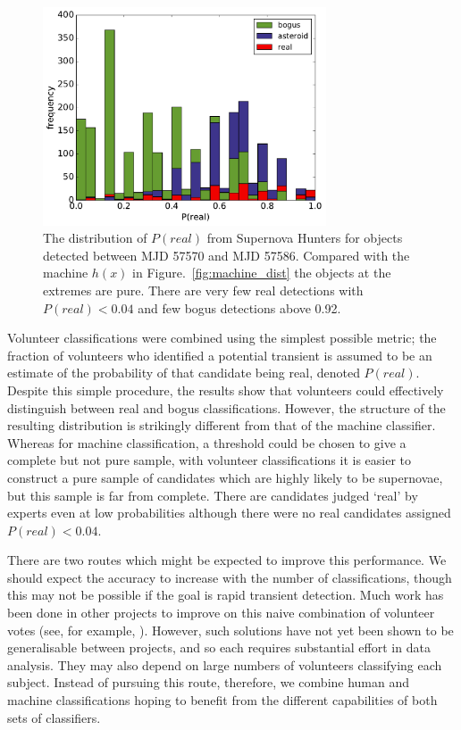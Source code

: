 \message{ !name(blank.tex)}\documentclass[a4paper,fleqn,usenatbib]{mnras}
\begin{document}
\begin{figure}
   \includegraphics[width=84mm]{figs/human_hist.pdf}
   \caption{The distribution of $P(real)$ from Supernova Hunters for objects detected between 
            MJD 57570 and MJD 57586.  Compared with the machine $h(x)$ in Figure.~\ref{fig:machine_dist}
            the objects at the extremes are pure.  There are very few real detections with 
            $P(real) < 0.04$ and few bogus detections above 0.92.} 
   \label{fig:human_dist} 
\end{figure}

Volunteer classifications were combined using the simplest possible metric; the fraction of volunteers who identified a potential transient is assumed to be an estimate of the probability of that candidate being real, denoted $P(real)$. Despite this simple procedure, the results show that volunteers could effectively distinguish between real and bogus classifications. However, the structure of the resulting distribution is strikingly different from that of the machine classifier. Whereas for machine classification, a threshold could be chosen to give a complete but not pure sample, with volunteer classifications it is easier to construct a pure sample of candidates which are highly likely to be supernovae, but this sample is far from complete. There are candidates judged `real' by experts even at low probabilities although there were no real candidates assigned $P(real) < 0.04$. 


There are two routes which might be expected to improve this performance. We should expect the accuracy to increase with the number of classifications, though this may not be possible if the goal is rapid transient detection. Much work has been done in other projects to improve on this naive combination of volunteer votes (see, for example, \citet{Schwamb12, Marshall16}). However, such solutions have not yet been shown to be generalisable between projects, and so each requires substantial effort in data analysis. They may also depend on large numbers of volunteers classifying each subject. Instead of pursuing this route, therefore, we combine human and machine classifications hoping to benefit from the different capabilities of both sets of classifiers. 
\end{document}
